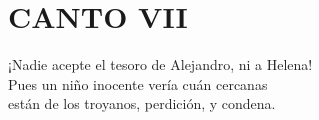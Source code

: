 \bnum
\section*{\centering\textbf{CANTO VII}}
%
\separator
\postart
{}
¡Nadie acepte el tesoro de Alejandro, ni a Helena!\\
Pues un niño inocente vería cuán cercanas\\
están de los troyanos, perdición, y condena.\par
\poend
\separator
\enum